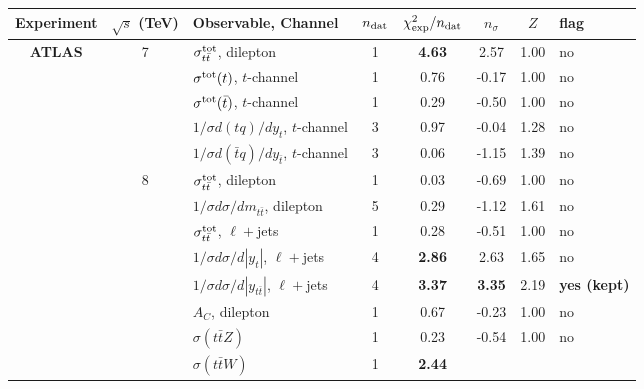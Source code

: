 \begin{table}[htbp]
  \begin{center}
{\fontsize{8pt}{8pt}\selectfont
  \centering
   \renewcommand{\arraystretch}{2}
   \setlength{\tabcolsep}{5pt}
   \begin{tabularx}{\textwidth}{ccXccccl}
  \toprule
  \textbf{Experiment}
  &\textbf{$\sqrt{s}$ (TeV)}
  &\textbf{Observable, Channel}
  & \textbf{$n_{\rm dat}$}
  & $\chi^2_{\rm exp}/n_{\rm dat}$
  & \textbf{$n_\sigma$}
  & $Z$
  & \textbf{flag}\\
  \midrule
  {\bf ATLAS }
  & 7
  & $\sigma_{t\bar{t}}^{\rm tot}$, dilepton
  & 1
  & {\bf 4.63}  
  & 2.57
  & 1.00
  & no  \\
  & 
  & $\sigma^{\rm tot}(t)$, $t$-channel
  & 1
  &  0.76 
  & -0.17
  & 1.00
  & no  \\
  & 
  & $\sigma^{\rm tot}(\bar{t})$, $t$-channel
  & 1
  &  0.29
  & -0.50
  & 1.00
  & no  \\
  & 
  & $1/\sigma d(tq)/dy_t$, $t$-channel
  & 3
  & 0.97 
  & -0.04
  & 1.28
  & no  \\
  & 
  & $1/\sigma d(\bar{t}q)/dy_{\bar{t}}$, $t$-channel
  & 3
  & 0.06 
  & -1.15
  & 1.39
  & no  \\ \midrule
  & 8
    & $\sigma_{t\bar{t}}^{\rm tot}$, dilepton
  & 1
  & 0.03
  & -0.69
  & 1.00
  & no \\
    &
    & $1/\sigma d\sigma/dm_{t\bar{t}}$, dilepton
  & 5
  & 0.29
  & -1.12
  & 1.61
  & no \\
    &
    & $\sigma_{t\bar{t}}^{\rm tot}$, $\ell+$jets 
  & 1
  & 0.28 
  & -0.51
  & 1.00 
  & no \\
     &
     & $1/\sigma d\sigma/d|y_t|$, $\ell+$jets
  & 4
  & {\bf 2.86} 
  & 2.63 
  & 1.65
  & no \\
  &
     & $1/\sigma d\sigma/d|y_{t\bar{t}}|$, $\ell+$jets 
  & 4
  & {\bf 3.37}
  & {\bf 3.35}
  & 2.19 
  & {\bf yes (kept)} \\
  &
  & $A_C$, dilepton
  & 1
  & 0.67
  & -0.23
  & 1.00
  & no\\
  & 
  & $\sigma(t\bar{t}Z)$
  & 1
  & 0.23
  & -0.54
  & 1.00
  & no \\
  & 
  & $\sigma(t\bar{t}W)$
  & 1
  & {\bf 2.44}

\end{tabularx}}
\end{center}
\end{table}
